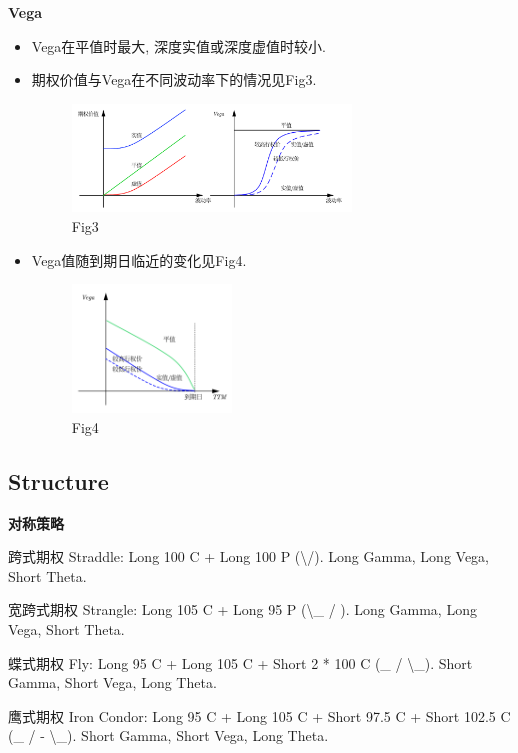 \documentclass[UTF8]{ctexart}
\begin{document}
\noindent \textbf{Vega} \par
\begin{itemize}
	\item Vega在平值时最大, 深度实值或深度虚值时较小.
	\item 期权价值与Vega在不同波动率下的情况见Fig3.
	      \begin{figure}[H]
		      \centering
		      \includegraphics[width=0.7\textwidth]{fig/fig3.png}
		      \caption{Fig3}
	      \end{figure}
	\item Vega值随到期日临近的变化见Fig4.
	      \begin{figure}[H]
		      \centering
		      \includegraphics[width=0.4\textwidth]{fig/fig4.png}
		      \caption{Fig4}
	      \end{figure}

\end{itemize}


\subsection{Structure}


\noindent \textbf{对称策略} \par

跨式期权 Straddle: Long 100 C + Long 100 P (\textbackslash /).
Long Gamma, Long Vega, Short Theta.

宽跨式期权 Strangle: Long 105 C + Long 95 P (\textbackslash \_ / ).
Long Gamma, Long Vega, Short Theta.

蝶式期权 Fly: Long 95 C + Long 105 C + Short 2 * 100 C (\_ / \textbackslash \_).
Short Gamma, Short Vega, Long Theta.

鹰式期权 Iron Condor: Long 95 C + Long 105 C + Short 97.5 C + Short 102.5 C (\_ / - \textbackslash \_).
Short Gamma, Short Vega, Long Theta.
\end{document}
